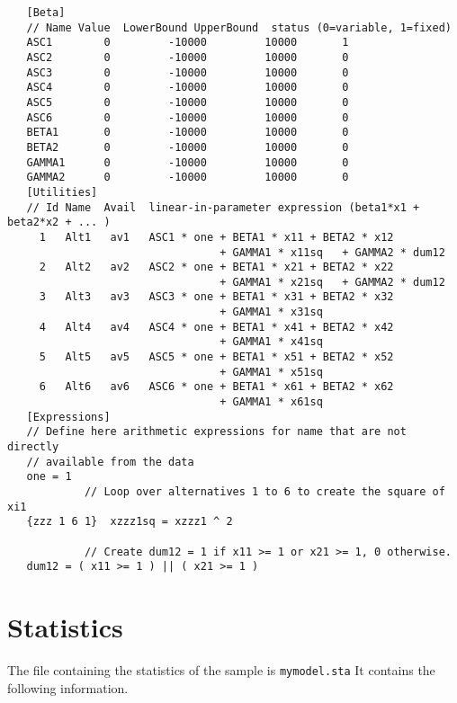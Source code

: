 \documentclass[12pt]{memoir}
\begin{document}
   {\footnotesize
   \begin{verbatim}
   [Beta]
   // Name Value  LowerBound UpperBound  status (0=variable, 1=fixed)
   ASC1        0         -10000         10000       1
   ASC2        0         -10000         10000       0
   ASC3        0         -10000         10000       0
   ASC4        0         -10000         10000       0
   ASC5        0         -10000         10000       0
   ASC6        0         -10000         10000       0
   BETA1       0         -10000         10000       0
   BETA2       0         -10000         10000       0
   GAMMA1      0         -10000         10000       0
   GAMMA2      0         -10000         10000       0
   [Utilities]
   // Id Name  Avail  linear-in-parameter expression (beta1*x1 + beta2*x2 + ... )
     1   Alt1   av1   ASC1 * one + BETA1 * x11 + BETA2 * x12  
                                 + GAMMA1 * x11sq   + GAMMA2 * dum12
     2   Alt2   av2   ASC2 * one + BETA1 * x21 + BETA2 * x22  
                                 + GAMMA1 * x21sq   + GAMMA2 * dum12
     3   Alt3   av3   ASC3 * one + BETA1 * x31 + BETA2 * x32  
                                 + GAMMA1 * x31sq
     4   Alt4   av4   ASC4 * one + BETA1 * x41 + BETA2 * x42  
                                 + GAMMA1 * x41sq
     5   Alt5   av5   ASC5 * one + BETA1 * x51 + BETA2 * x52  
                                 + GAMMA1 * x51sq
     6   Alt6   av6   ASC6 * one + BETA1 * x61 + BETA2 * x62  
                                 + GAMMA1 * x61sq
   [Expressions] 
   // Define here arithmetic expressions for name that are not directly 
   // available from the data
   one = 1
            // Loop over alternatives 1 to 6 to create the square of xi1
   {zzz 1 6 1}  xzzz1sq = xzzz1 ^ 2

            // Create dum12 = 1 if x11 >= 1 or x21 >= 1, 0 otherwise.
   dum12 = ( x11 >= 1 ) || ( x21 >= 1 )
   \end{verbatim}
  }

\section{Statistics}
\label{sec:stat}
   The file containing the statistics of the sample is \texttt{mymodel.sta}
   It contains the following information.
\end{document}
